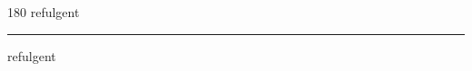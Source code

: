 
\begin{frame}
\begin{center}
\begin{turn}{180}
{\fontsize{2.5cm}{1em}\selectfont refulgent}
\end{turn}
\vspace{1em}\par  
\hrule
\vspace{1em}\par  
{\fontsize{2.5cm}{1em}\selectfont refulgent}
\end{center}
\end{frame}
